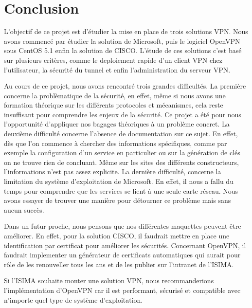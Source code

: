 \section*{Conclusion}

L'objectif de ce projet est d'étudier la mise en place de trois solutions VPN. Nous avons commencé par étudier la solution de Microsoft, puis le logiciel OpenVPN sous CentOS 5.1 enfin la solution de CISCO. L'étude de ces solutions c'est basé sur plusieurs critères, comme le deploiement rapide d'un client VPN chez l'utilisateur, la sécurité du tunnel et enfin l'administration du serveur VPN.
 
Au cours de ce projet, nous avons rencontré trois grandes difficultés. La première concerne la problèmatique de la sécurité, en effet, même si nous avons une formation théorique sur les différents protocoles et mécanismes, cela reste insuffisant pour comprendre les enjeux de la sécurité. Ce projet a été pour nous l'opportunité d'appliquer nos bagages théoriques à un problème concret.
La deuxième difficulté concerne l'absence de documentation sur ce sujet. En effet, dès que l'on commence à chercher des informations spécifiques, comme par exemple la configuration d'un service en particulier ou sur la génération de clés on ne trouve rien de concluant. Même sur les sites des différents constructeurs, l'informations n'est pas assez explicite.
La dernière difficulté, concerne la limitation du système d'exploitation de Microsoft. En effet, il nous a fallu du temps pour comprendre que les services se lient à une seule carte réseau. Nous avons essayer de trouver une manière pour détourner ce problème mais sans aucun succès.

Dans un futur proche, nous pensons que nos différentes maquettes peuvent être améliorer. En effet, pour la solution CISCO, il faudrait mettre en place une identification par certificat pour améliorer les sécurités. Concernant OpenVPN, il faudrait implementer un générateur de certificats automatiques qui aurait pour rôle de les renouveller tous les ans et de les publier sur l'intranet de l'ISIMA. 


Si l'ISIMA souhaite monter une solution VPN, nous recommanderions l'implémentation d'OpenVPN car il est performant, sécurisé et compatible avec n'importe quel type de système d'exploitation.


\pagebreak
